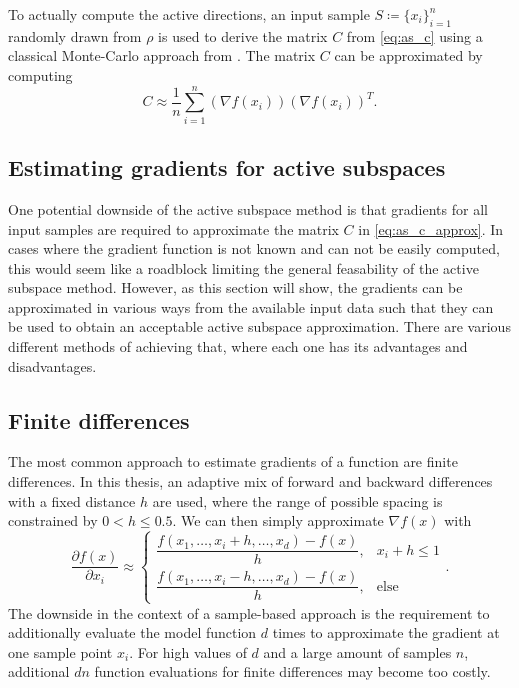 \documentclass[
  a4paper,  %
  twoside,  %
  bibliography=totoc,
  headsepline,
  cleardoublepage=empty,
  parskip=half,
  draft=false
]{scrbook}
\begin{document}
To actually compute the active directions, an input sample $S \coloneqq \{x_i\}_{i=1}^n$ randomly drawn from $\rho$ is used to derive the matrix $C$ from \cref{eq:as_c} using a classical Monte-Carlo approach from \cite{Constantine2014}.
The matrix $C$ can be approximated by computing
\begin{equation}
C \approx \frac{1}{n} \sum_{i=1}^n  \left(\nabla f(x_i)\right) \left(\nabla f(x_i)\right)^T.
\label{eq:as_c_approx}
\end{equation}

\subsection{Estimating gradients for active subspaces}
\label{sec:as_est}

One potential downside of the active subspace method is that gradients for all input samples are required to approximate the matrix $C$ in \cref{eq:as_c_approx}.
In cases where the gradient function is not known and can not be easily computed, this would seem like a roadblock limiting the general feasability of the active subspace method.
However, as this section will show, the gradients can be approximated in various ways from the available input data such that they can be used to obtain an acceptable active subspace approximation.
There are various different methods of achieving that, where each one has its advantages and disadvantages.

\subsection{Finite differences}

The most common approach to estimate gradients of a function are finite differences.
In this thesis, an adaptive mix of forward and backward differences with a fixed distance $h$ are used, where the range of possible spacing is constrained by $0 < h \leq 0.5$.
We can then simply approximate $\nabla f(x)$ with
\begin{equation}
\frac{\partial f(x)}{\partial x_i} \approx
\begin{cases}
    \dfrac{f(x_1, \dots, x_i + h, \dots, x_d) - f(x)}{h}, & x_i + h \leq 1 \\[1.5em]
    \dfrac{f(x_1, \dots, x_i - h, \dots, x_d) - f(x)}{h}, & \text{else}
\end{cases}.
\end{equation}
%
The downside in the context of a sample-based approach is the requirement to additionally evaluate the model function $d$ times to approximate the gradient at one sample point $x_i$.
For high values of $d$ and a large amount of samples $n$, additional $dn$ function evaluations for finite differences may become too costly.
\end{document}
